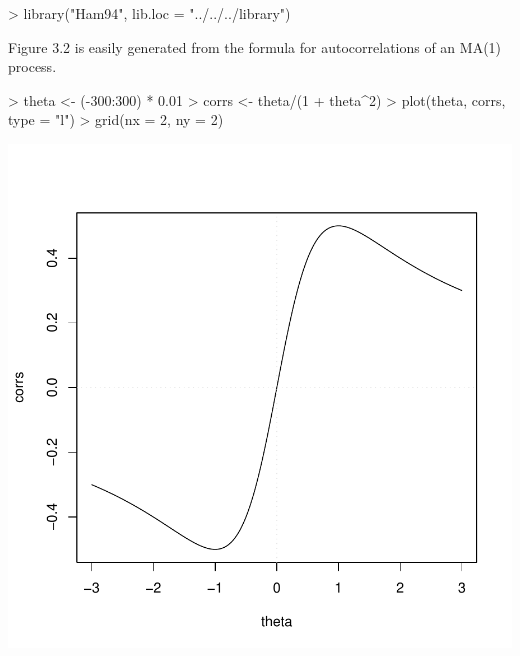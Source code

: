 \begin{Schunk}
\begin{Sinput}
> library("Ham94", lib.loc = "../../../library")
\end{Sinput}
\end{Schunk}
Figure 3.2 is easily generated from the formula for autocorrelations of an MA(1) process.
\begin{Schunk}
\begin{Sinput}
> theta <- (-300:300) * 0.01
> corrs <- theta/(1 + theta^2)
> plot(theta, corrs, type = "l")
> grid(nx = 2, ny = 2)
\end{Sinput}
\end{Schunk}
\includegraphics{p51-002}
